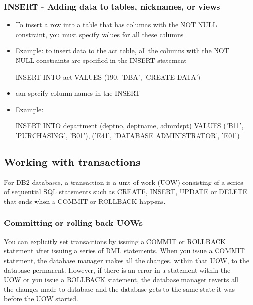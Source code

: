 \documentclass{article}
\begin{document}
\subsubsection{INSERT - Adding data to tables, nicknames, or views}
\begin{itemize}
\item To insert a row into a table that has columns with the NOT NULL constraint, you must specify
values for all these columns
\item Example: to insert data to the act table, all the columns with the NOT NULL constraints are 
specified in the INSERT statement
\begin{sqlcode}
INSERT INTO act VALUES (190, 'DBA', 'CREATE DATA')
\end{sqlcode}
\item can specify column names in the INSERT
\item Example:
\begin{sqlcode}
INSERT INTO department (deptno, deptname, admrdept) VALUES
	('B11', 'PURCHASING', 'B01'),
	('E41', 'DATABASE ADMINISTRATOR', 'E01')
\end{sqlcode}
\end{itemize}

\subsection{Working with transactions}
For DB2 databases, a transaction is a unit of work (UOW) consisting of a series of sequential SQL
statements such as CREATE, INSERT, UPDATE or DELETE that ends when a COMMIT or ROLLBACK happens.
\subsubsection{Committing or rolling back UOWs}
You can explicitly set transactions by issuing a COMMIT or ROLLBACK statement after issuing a series
of DML statements. When you issue a COMMIT statement, the database manager makes all the changes,
within that UOW, to the database permanent. However, if there is an error in a statement within the UOW
or you issue a ROLLBACK statement, the database manager reverts all the changes made to database and the
database gets to the same state it was before the UOW started.
\end{document}
